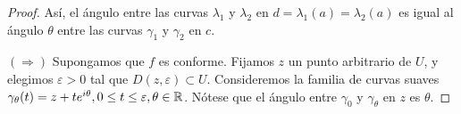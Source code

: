\begin{proof}
    Así, el ángulo entre las curvas $\lambda_1$ y $\lambda_2$ en $d = \lambda_1(a) = \lambda_2(a)$ es igual al ángulo $\theta$ entre las curvas $\gamma_1$ y $\gamma_2$ en $c$. \\ \par

    \begin{comment}    
    $(\Leftarrow)$ Supongamos que $f(z)$ es una función holomorfa en $U$ tal que $f'(z) \not = 0$ para $z \in U$ y consideremos $f:z \rightarrow w=f(z)$. Sea $\gamma: [a,b] \rightarrow U$ una curva suave. Consideremos $\lambda = (f \circ  \gamma)(t)$. Por la regla de la cadena, $\lambda$ es continuamente diferenciable y como $f'(\gamma(t)) \not = 0$, tenemos
    \begin{equation}
        \label{cadena}
        \lambda'(t) = f'(\gamma(t))\gamma'(t).
    \end{equation}

    Por lo tanto, $\lambda$ es una curva suave en el plano $w$.

    Sean $\gamma_1, \gamma_2: [a,b] \rightarrow U$ curvas suaves tales que $c=\gamma_1(a) = \gamma_2(a)$. Definimos el ángulo $\theta$ entre $\gamma_1$ y $\gamma_2$ en $c$ como el argumento de $\frac{\gamma_2'(a)}{\gamma_1'(a)}$, es decir,
    \begin{equation*}
        \dfrac{\gamma_2'(a)}{\gamma_1'(a)} = \abs{\dfrac{\gamma_2'(a)}{\gamma_1'(a)}} e^{i\theta}.
    \end{equation*}

    La aplicación $f$ lleva las curvas $\gamma_1$ y $\gamma_2$ en curvas suaves $\lambda_1=f(\gamma_1)$ y $\lambda_2=f(\gamma_2)$ que tienen como punto inicial $d=f(c)$. Por \ref{cadena} tenemos
    \begin{equation*}
        \dfrac{\lambda_2'(a)}{\lambda_1'(a)} = \dfrac{\gamma_2'(a)}{\gamma_1'(a)}
    \end{equation*}
    entonces el ángulo entre las curvas $\lambda_1$ y $\lambda_2$ en $d = \lambda_1(a) = \lambda_2(a)$ es igual al ángulo $\theta$ entre las curvas $\gamma_1$ y $\gamma_2$ en $c$. \\ \par
    \end{comment}

    $(\Rightarrow)$ Supongamos que $f$ es conforme. Fijamos $z$ un punto arbitrario de $U$, y elegimos $\varepsilon > 0$ tal que $D(z, \varepsilon) \subset U$. Consideremos la familia de curvas suaves $\gamma_{\theta}(t) = z + te^{i \theta}, 0 \leq t \leq \varepsilon, \theta \in \mathbb{R}$. Nótese que el ángulo entre $\gamma_0$ y $\gamma_{\theta}$ en $z$ es $\theta$.



\end{proof}
